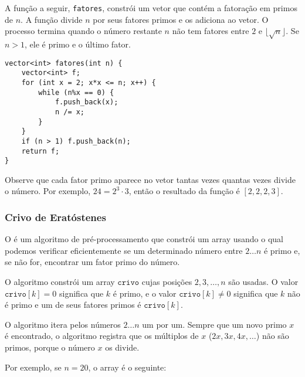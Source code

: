 \noindent
A função a seguir, \texttt{fatores}, constrói um vetor que contém a fatoração em primos de $n$. A função divide $n$ por seus fatores primos e os adiciona ao vetor. O processo termina quando o número restante $n$ não tem fatores entre $2$ e $\lfloor \sqrt n \rfloor$. Se $n>1$, ele é primo e o último fator.

\begin{lstlisting}
vector<int> fatores(int n) {
    vector<int> f;
    for (int x = 2; x*x <= n; x++) {
        while (n%x == 0) {
            f.push_back(x);
            n /= x;
        }
    }
    if (n > 1) f.push_back(n);
    return f;
}
\end{lstlisting}

Observe que cada fator primo aparece no vetor tantas vezes quantas vezes divide o número. Por exemplo, $24=2^3 \cdot 3$, então o resultado da função é $[2,2,2,3]$.

\subsubsection{Crivo de Eratóstenes}


O 
é um algoritmo de pré-processamento que constrói um array usando o qual podemos verificar eficientemente se um determinado número entre $2 \ldots n$ é primo e, se não for, encontrar um fator primo do número.

O algoritmo constrói um array $\texttt{crivo}$ cujas posições $2,3,\ldots,n$ são usadas. O valor $\texttt{crivo}[k]=0$ significa que $k$ é primo, e o valor $\texttt{crivo}[k] \neq 0$ significa que $k$ não é primo e um de seus fatores primos é $\texttt{crivo}[k]$.

O algoritmo itera pelos números $2 \ldots n$ um por um. Sempre que um novo primo $x$ é encontrado, o algoritmo registra que os múltiplos de $x$ ($2x,3x,4x,\ldots$) não são primos, porque o número $x$ os divide.

Por exemplo, se $n=20$, o array é o seguinte:


